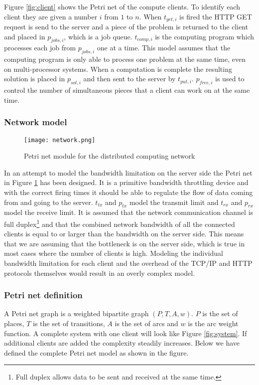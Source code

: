 Figure \ref{fig:client} shows the Petri net of the compute clients.
To identify each client they are given a number $i$ from $1$ to $n$.
When $t_{get,i}$ is fired the HTTP GET request is send to the server and a piece of the problem is returned to the client and placed in $p_{jobs,i}$, which is a job queue.
$t_{comp,i}$ is the computing program which processes each job from $p_{jobs,i}$ one at a time.
This model assumes that the computing program is only able to process one problem at the same time, even on multi-processor systems.
When a computation is complete the resulting solution is placed in $p_{sol,i}$ and then sent to the server by $t_{put,i}$.
$p_{free,i}$ is used to control the number of simultaneous pieces that a client can work on at the same time.


\subsubsection{Network model}

\begin{figure}[htbp]
	\centering 
	\texttt{[image: network.png]}
	\caption{Petri net module for the distributed computing network}
	\label{fig:network}
\end{figure}

In an attempt to model the bandwidth limitation on the server side the Petri net in Figure \ref{fig:network} has been designed.
It is a primitive bandwidth throttling device and with the correct firing times it should be able to regulate the flow of data coming from and going to the server.
$t_{tx}$ and $p_{tx}$ model the transmit limit and $t_{rx}$ and $p_{rx}$ model the receive limit.
It is assumed that the network communication channel is full duplex\footnote{Full duplex allows data to be sent and received at the same time.} and that the combined network bandwidth of all the connected clients is equal to or larger than the bandwidth on the server side.
This means that we are assuming that the bottleneck is on the server side, which is true in most cases where the number of clients is high.
Modeling the individual bandwidth limitation for each client and the overhead of the TCP/IP and HTTP protocols themselves would result in an overly complex model.


\subsubsection{Petri net definition}

A Petri net graph is a weighted bipartite graph $(P, T, A, w)$.
$P$ is the set of places, $T$ is the set of transitions, $A$ is the set of arcs and $w$ is the arc weight function.
A complete system with one client will look like Figure \ref{fig:system}.
If additional clients are added the complexity steadily increases.
Below we have defined the complete Petri net model as shown in the figure.

